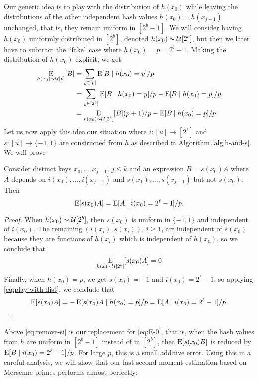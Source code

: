 Our generic idea is to play with the distribution of $h(x_0)$ while
leaving the distributions of the other independent hash values
$h(x_0)\ldots,h(x_{j - 1})$ unchanged, that is, they remain uniform in
$[2^b-1]$. We will consider having $h(x_0)$ uniformly distributed in
$[2^b]$, denoted $h(x_0) \sim \mathcal{U}[2^b]$, but then we later have to
subtract the ``fake'' case where $h(x_0)=p=2^b-1$.  Making the
distribution of $h(x_0)$ explicit, we get
\begin{equation}\begin{split}
  \operatorname*{E}_{h(x_0) \sim \mathcal{U}[p]}[B]&=\sum_{y\in[p]}\operatorname*{E}[B \mid h(x_0)=y]/p
                            \\&=\sum_{y\in[2^b]}\operatorname*{E}[B \mid h(x_0)=y]/p - \operatorname*{E}[B \mid h(x_0)=p]/p
                            \\ &=\operatorname*{E}_{h(x_0) \sim \mathcal{U}[2^b]}[B](p+1)/p - \operatorname*{E}[B \mid h(x_0)=p]/p.\label{eq:play-with-dist}
\end{split}\end{equation}
Let us now apply this idea our situation where $i:[u]\to[2^\ell]$ and
$s:[u]\to\{-1,1\}$ are constructed from $h$ as described in Algorithm
\ref{alg:h-and-s}. We will prove
\begin{lemma}\label{lem:remove-si}  Consider distinct keys $x_0,\ldots,x_{j - 1}$, $j\leq k$ and an expression $B=s(x_0)A$ where $A$
   depends on $i(x_0),\ldots,i(x_{j - 1})$ and $s(x_1),\ldots,s(x_{j - 1})$ but not
   $s(x_0)$. Then
   \begin{equation}\label{eq:remove-si}
      \operatorname*{E}[s(x_0)A]=\operatorname*{E}[A\mid i(x_0)=2^\ell-1]/p.
   \end{equation}
\end{lemma}
\begin{proof}
When $h(x_0) \sim \mathcal{U}[2^b]$, then $s(x_0)$ is uniform
in $\{-1,1\}$ and independent of $i(x_0)$. The remaining
$(i(x_i),s(x_i))$, $i\ge 1$, are independent of $s(x_0)$ because they
are functions of $h(x_i)$ which is independent of $h(x_0)$, so
we conclude that 
\[\operatorname*{E}_{h(x) \sim \mathcal{U}[2^b]}[s(x_0)A]=0\]
Finally, when $h(x_0)=p$, we get $s(x_0)=-1$ and $i(x_0)=2^\ell-1$, 
so applying \eqref{eq:play-with-dist}, we conclude
that 
\[\operatorname*{E}[s(x_0)A] = -\operatorname*{E}[s(x_0) A \mid h(x_0) = p]/p = \operatorname*{E}[A \mid i(x_0)=2^\ell-1]/p.\]
\end{proof}
Above \eqref{eq:remove-si} is our replacement for \eqref{eq:E-0}, that is,
when the hash values from $h$ are uniform in $[2^b-1]$ instead of
in $[2^b]$, then $\operatorname*{E}[s(x_0)B]$ is reduced by $\operatorname*{E}[B \mid i(x_0)=2^\ell-1]/p$.
For large $p$, this is a small additive error. Using this in a careful
analysis, we will show that our fast second moment estimation 
based on Mersenne primes performs almost perfectly:

